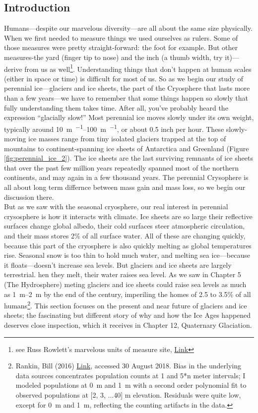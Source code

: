 \documentclass[amstex,12pt]{book}
\begin{document}
\subsection{Introduction}
Humans---despite our marvelous diversity---are all about the same size physically. When we first needed to measure things we used ourselves as rulers. Some of those measures were pretty straight-forward: the foot for example. But other measures-the yard (finger tip to nose) and the inch (a thumb width, try it)---derive from us as well\footnote{see Russ Rowlett's marvelous units of measure site, \href{http://www.ibiblio.org/units/custom.html}{Link}}. Understanding things that don't happen at human scales (either in space or time) is difficult for most of us. So as we begin our study of perennial ice---glaciers and ice sheets, the part of the Cryosphere that lasts more than a few years---we have to remember that some things happen so slowly that fully understanding them takes time. After all, you've probably heard the expression ``glacially slow!'' Most perennial ice moves slowly under its own weight, typically around \SIrange{10}{100}{\metre\per\year}, or about 0.5 inch per hour. These slowly-moving ice masses range from tiny isolated glaciers trapped at the top of mountains to continent-spanning ice sheets of Antarctica and Greenland (Figure \ref{fig:perennial_ice_2}). The ice sheets are the last surviving remnants of ice sheets that over the past few million years repeatedly spanned most of the northern continents, and may again in a few thousand years. The perennial Crysophere is all about long term differnce between mass gain and mass loss, so we begin our discussion there.  \\

But as we saw with the seasonal cryosphere, our real interest in perennial crysosphere is how it interacts with climate. Ice sheets are so large their reflective surfaces change global albedo, their cold surfaces steer atmospheric circulation, and their mass stores 2\% of all surface water. All of these are changing quickly, because this part of the cryosphere is also quickly melting as global temperatures rise. Seasonal snow is too thin to hold much water, and melting sea ice---because it floats---doesn't increase sea levels. But glaciers and ice sheets are largely terrestrial. hen they melt, their water raises sea level. As we saw in Chapter 5 (The Hydrosphere) meting glaciers and ice sheets could raise sea levels as much as \SIrange{1}{2}{\metre} by the end of the century, imperiling the homes of 2.5 to 3.5\% of all humans\footnote{ Rankin, Bill (2016) \href{http://www.radicalcartography.net/index.html?howhigh}{Link}, accessed 30 August 2018. Bias in the underlying data sources concentrates population counts at 1 and 5*n meter intervals; I modeled populations at \SI{0}{\metre} and \SI{1}{\metre} with a second order polynomial fit to observed populations at [2, 3, ...40] m elevation. Residuals were quite low, except for \SI{0}{\metre} and \SI{1}{\metre}, reflecting the counting artifacts in the data.}. This section focuses on the present and near future of glaciers and ice sheets; the fascinating but different story of why and how the Ice Ages happened deserves close inspection, which it receives in Chapter 12, Quaternary Glaciation.  
 
\end{document}
